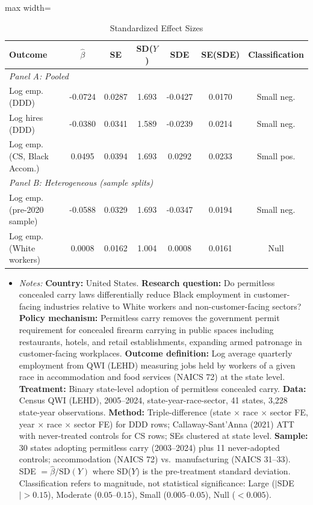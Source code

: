 \begin{table}[t]
\centering
\caption{Standardized Effect Sizes}
\label{tab:sde}
\begin{adjustbox}{max width=\textwidth}
\begin{tabular}{lcccccc}
\hline\hline
Outcome & $\hat{\beta}$ & SE & SD($Y$) & SDE & SE(SDE) & Classification \\
\hline
\multicolumn{7}{l}{\textit{Panel A: Pooled}} \\
Log emp. (DDD) & -0.0724 & 0.0287 & 1.693 & -0.0427 & 0.0170 & Small neg. \\
Log hires (DDD) & -0.0380 & 0.0341 & 1.589 & -0.0239 & 0.0214 & Small neg. \\
Log emp. (CS, Black Accom.) & 0.0495 & 0.0394 & 1.693 & 0.0292 & 0.0233 & Small pos. \\
\hline
\multicolumn{7}{l}{\textit{Panel B: Heterogeneous (sample splits)}} \\
Log emp. (pre-2020 sample) & -0.0588 & 0.0329 & 1.693 & -0.0347 & 0.0194 & Small neg. \\
Log emp. (White workers) & 0.0008 & 0.0162 & 1.004 & 0.0008 & 0.0161 & Null \\
\hline\hline
\end{tabular}
\end{adjustbox}
\par\vspace{0.3em}
{\footnotesize
\begin{itemize}[leftmargin=*,nosep]
\item \textit{Notes:} \textbf{Country:} United States. \textbf{Research question:} Do permitless concealed carry laws differentially reduce Black employment in customer-facing industries relative to White workers and non-customer-facing sectors? \textbf{Policy mechanism:} Permitless carry removes the government permit requirement for concealed firearm carrying in public spaces including restaurants, hotels, and retail establishments, expanding armed patronage in customer-facing workplaces. \textbf{Outcome definition:} Log average quarterly employment from QWI (LEHD) measuring jobs held by workers of a given race in accommodation and food services (NAICS 72) at the state level. \textbf{Treatment:} Binary state-level adoption of permitless concealed carry. \textbf{Data:} Census QWI (LEHD), 2005--2024, state-year-race-sector, 41 states, 3,228 state-year observations. \textbf{Method:} Triple-difference (state $\times$ race $\times$ sector FE, year $\times$ race $\times$ sector FE) for DDD rows; Callaway-Sant'Anna (2021) ATT with never-treated controls for CS rows; SEs clustered at state level. \textbf{Sample:} 30 states adopting permitless carry (2003--2024) plus 11 never-adopted controls; accommodation (NAICS 72) vs.\ manufacturing (NAICS 31--33). SDE $= \hat{\beta} / \text{SD}(Y)$ where SD($Y$) is the pre-treatment standard deviation. Classification refers to magnitude, not statistical significance: Large ($|$SDE$| > 0.15$), Moderate ($0.05$--$0.15$), Small ($0.005$--$0.05$), Null ($< 0.005$).
\end{itemize}
}
\end{table}

